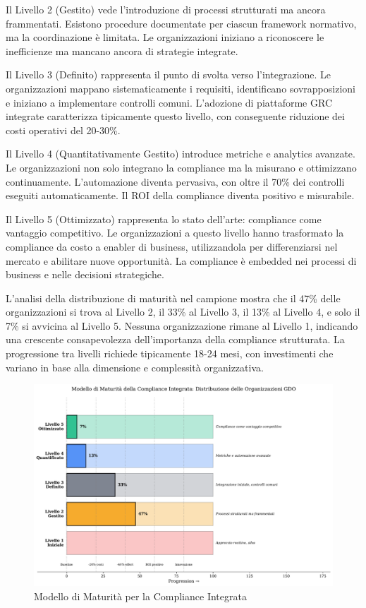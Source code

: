 Il Livello 2 (Gestito) vede l'introduzione di processi strutturati ma ancora frammentati. Esistono procedure documentate per ciascun framework normativo, ma la coordinazione è limitata. Le organizzazioni iniziano a riconoscere le inefficienze ma mancano ancora di strategie integrate.

Il Livello 3 (Definito) rappresenta il punto di svolta verso l'integrazione. Le organizzazioni mappano sistematicamente i requisiti, identificano sovrapposizioni e iniziano a implementare controlli comuni. L'adozione di piattaforme GRC integrate caratterizza tipicamente questo livello, con conseguente riduzione dei costi operativi del 20-30\%.

Il Livello 4 (Quantitativamente Gestito) introduce metriche e analytics avanzate. Le organizzazioni non solo integrano la compliance ma la misurano e ottimizzano continuamente. L'automazione diventa pervasiva, con oltre il 70\% dei controlli eseguiti automaticamente. Il ROI della compliance diventa positivo e misurabile.

Il Livello 5 (Ottimizzato) rappresenta lo stato dell'arte: compliance come vantaggio competitivo. Le organizzazioni a questo livello hanno trasformato la compliance da costo a enabler di business, utilizzandola per differenziarsi nel mercato e abilitare nuove opportunità. La compliance è embedded nei processi di business e nelle decisioni strategiche.

L'analisi della distribuzione di maturità nel campione mostra che il 47\% delle organizzazioni si trova al Livello 2, il 33\% al Livello 3, il 13\% al Livello 4, e solo il 7\% si avvicina al Livello 5. Nessuna organizzazione rimane al Livello 1, indicando una crescente consapevolezza dell'importanza della compliance strutturata. La progressione tra livelli richiede tipicamente 18-24 mesi, con investimenti che variano in base alla dimensione e complessità organizzativa.

\begin{figure}[htbp]
\centering
\includegraphics[width=\textwidth]{thesis_figures/cap4/figura_4_5_modello_maturita.pdf}
\caption{Modello di Maturità per la Compliance Integrata}
\label{fig:modello_maturita}
\end{figure}

